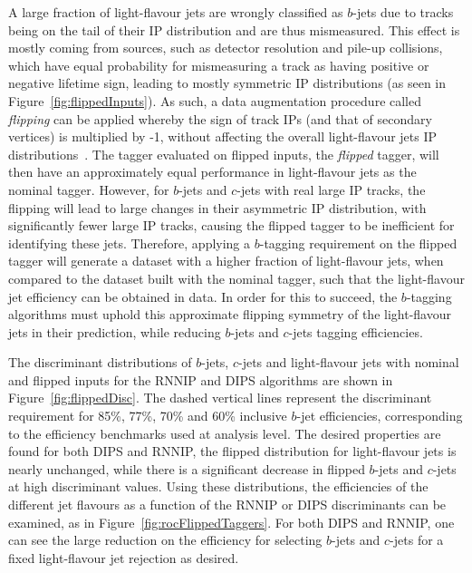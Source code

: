 A large fraction of light-flavour jets are wrongly classified as $b$-jets due to tracks being on the tail of their IP distribution and are thus mismeasured. 
This effect is mostly coming from sources, such as detector resolution and pile-up collisions, which have equal probability for mismeasuring a track as having positive or negative lifetime sign, leading to mostly symmetric IP distributions (as seen in Figure~\ref{fig:flippedInputs}).
As such, a data augmentation procedure called \textit{flipping} can be applied whereby the sign of track IPs (and that of secondary vertices) is multiplied by -1, without affecting the overall light-flavour jets IP distributions~\cite{ATLAS-CONF-2018-006}.
The tagger evaluated on flipped inputs, the \textit{flipped} tagger, will then have an approximately equal performance in light-flavour jets as the nominal tagger.
However, for $b$-jets and $c$-jets with real large IP tracks, the flipping will lead to large changes in their asymmetric IP distribution, with significantly fewer large IP tracks, causing the flipped tagger to be inefficient for identifying these jets. 
Therefore, applying a $b$-tagging requirement on the flipped tagger will generate a dataset with a higher fraction of light-flavour jets, when compared to the dataset built with the nominal tagger, such that the light-flavour jet efficiency can be obtained in data. 
In order for this to succeed, the $b$-tagging algorithms must uphold this approximate flipping symmetry of the light-flavour jets in their prediction, while reducing $b$-jets and $c$-jets tagging efficiencies.

The discriminant distributions of $b$-jets, $c$-jets and light-flavour jets with nominal and flipped inputs for the RNNIP and DIPS algorithms are shown in Figure~\ref{fig:flippedDisc}. 
The dashed vertical lines represent the discriminant requirement for 85\%, 77\%, 70\% and 60\% inclusive $b$-jet efficiencies, corresponding to the efficiency benchmarks used at analysis level. 
The desired properties are found for both DIPS and RNNIP, the flipped distribution for light-flavour jets is nearly unchanged, while there is a significant decrease in flipped $b$-jets and $c$-jets at high discriminant values. 
Using these distributions, the efficiencies of the different jet flavours as a function of the RNNIP or DIPS discriminants can be examined, as in Figure~\ref{fig:rocFlippedTaggers}.  
For both DIPS and RNNIP, one can see the large reduction on the efficiency for selecting $b$-jets and $c$-jets for a fixed light-flavour jet rejection as desired.

